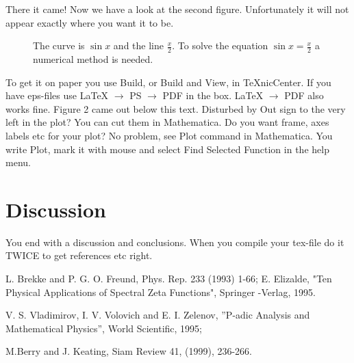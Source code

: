 \documentclass[11pt,a4paper]{article}
\begin{document}
There it came! Now we have a look at the second figure. Unfortunately it will not appear exactly where
you want it to be.
\begin{figure}[tbph]
\caption{ The curve is $\sin x$ and the line $\frac{x}{2}$. To solve
the equation $\sin x = \frac{x}{2}$ a numerical method is needed. 
}
\end{figure}
 To get it on paper you use Build, or Build and View, in TeXnicCenter. If you have eps-files
use LaTeX $\rightarrow$ PS $\rightarrow$ PDF in the box.  LaTeX $\rightarrow$ PDF also works fine. Figure 2 came out below this text.
Disturbed by Out sign to the very left in the plot? You can cut them in Mathematica. Do you want frame, axes labels etc
for your plot? No problem, see Plot command in Mathematica. You write Plot, mark it with mouse and select
Find Selected Function in the help menu.

\section{Discussion}
You end with a discussion and conclusions. When you compile your tex-file do it TWICE to get references etc right.

\begin{thebibliography}{99}
  L. Brekke and P. G. O. Freund, Phys. Rep. 233 (1993) 1-66;
E. Elizalde, "Ten Physical Applications of Spectral Zeta Functions", Springer
-Verlag, 1995.

  V. S. Vladimirov, I. V. Volovich and E. I. Zelenov,
''P-adic Analysis and Mathematical Physics'', World Scientific, 1995;


  M.Berry and J. Keating, Siam Review 41, (1999), 236-266.
\end{thebibliography}
\end{document}
